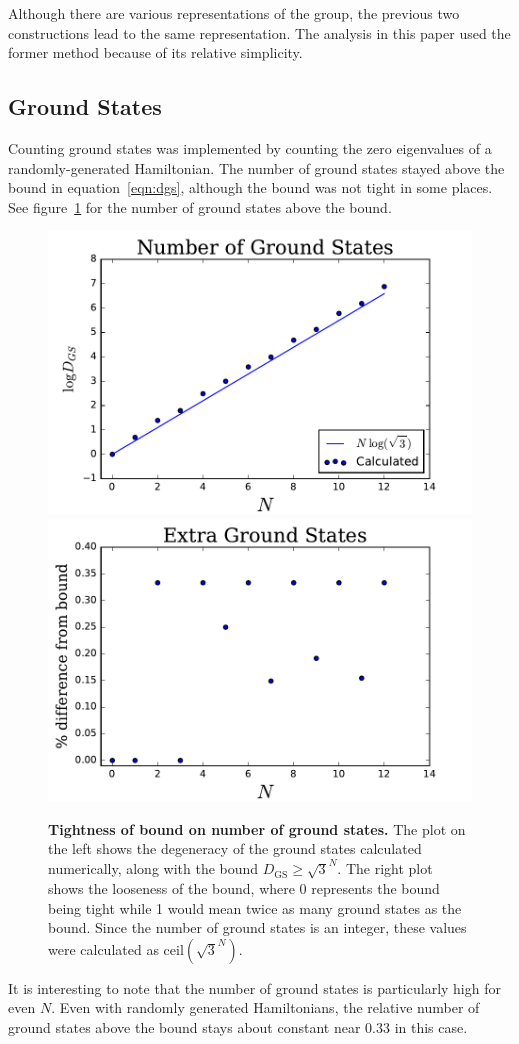 \documentclass[12pt]{article} %
\begin{document}
Although there are various representations of the group, the previous two constructions lead to the same representation. The analysis in this paper used the former method because of its relative simplicity.

\subsection{Ground States} \emph{} \label{sub:num_gs}

Counting ground states was implemented by counting the zero eigenvalues of a randomly-generated Hamiltonian. The number of ground states stayed above the bound in equation~\ref{eqn:dgs}, although the bound was not tight in some places. See figure~\ref{fig:gserr} for the number of ground states above the bound.

\begin{figure}
	\centering
	\includegraphics[width=.49\textwidth]{gscount}
	\includegraphics[width=.49\textwidth]{gserr}
	\caption{\textbf{Tightness of bound on number of ground states.} The plot on the left shows the degeneracy of the ground states calculated numerically, along with the bound $D_\text{GS} \ge \sqrt{3}^N$. The right plot shows the looseness of the bound, where 0 represents the bound being tight while 1 would mean twice as many ground states as the bound. Since the number of ground states is an integer, these values were calculated as $\text{ceil}(\sqrt{3}^N)$.}
	\label{fig:gserr}
\end{figure}

It is interesting to note that the number of ground states is particularly high for even $N$. Even with randomly generated Hamiltonians, the relative number of ground states above the bound stays about constant near 0.33 in this case.
\end{document}
